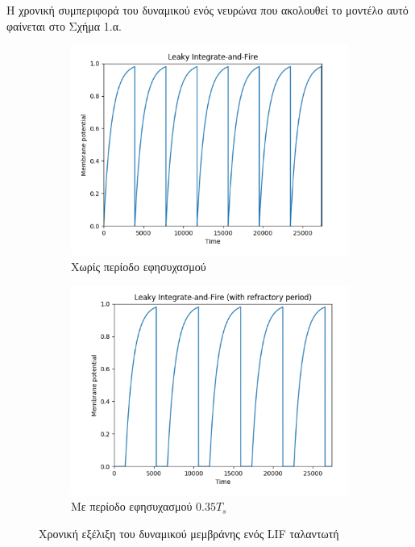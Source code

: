 \documentclass[12pt,a4paper]{article}
\begin{document}
Η χρονική συμπεριφορά του δυναμικού ενός νευρώνα που ακολουθεί το μοντέλο αυτό φαίνεται στο Σχήμα 1.α.
 
\begin{figure}[h!]
  \centering
  \begin{subfigure}[b]{0.45\linewidth}
    \includegraphics[width=\linewidth]{Figures/osc.png}
    \caption{Χωρίς περίοδο εφησυχασμού}
  \end{subfigure}
  \begin{subfigure}[b]{0.45\linewidth}
    \includegraphics[width=\linewidth]{Figures/osc_refrac.png}
    \caption{Με περίοδο εφησυχασμού $0.35T_s$}
  \end{subfigure}
  \caption{Χρονική εξέλιξη του δυναμικού μεμβράνης ενός LIF ταλαντωτή}
\end{figure}
\end{document}
